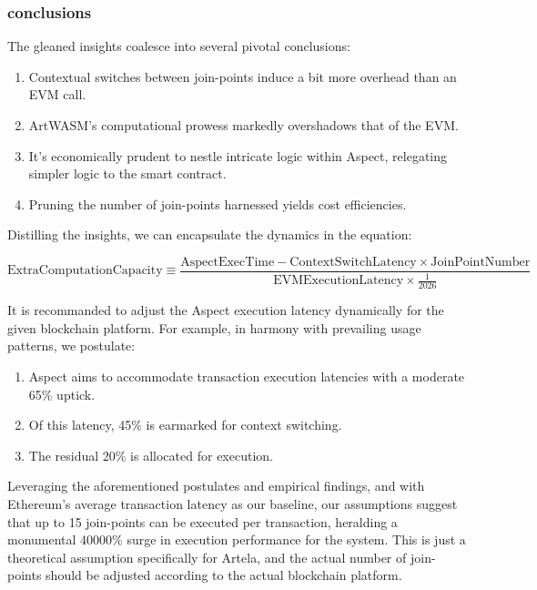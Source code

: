 \subsubsection{conclusions}
The gleaned insights coalesce into several pivotal conclusions:

\begin{enumerate}
  \item Contextual switches between join-points induce a bit more overhead than an EVM call.
  \item ArtWASM's computational prowess markedly overshadows that of the EVM.
  \item It's economically prudent to nestle intricate logic within Aspect, relegating simpler logic to the smart contract.
  \item Pruning the number of join-points harnessed yields cost efficiencies.
\end{enumerate}

Distilling the insights, we can encapsulate the dynamics in the equation:

\[
  \text{ExtraComputationCapacity} \equiv \frac{\text{AspectExecTime} - \text{ContextSwitchLatency} \times \text{JoinPointNumber}}{\text{EVMExecutionLatency} \times \frac{1}{2026}}
\]

It is recommanded to adjust the Aspect execution latency dynamically for the given blockchain platform. For example, in harmony with prevailing usage patterns, we postulate:

\begin{enumerate}
  \item Aspect aims to accommodate transaction execution latencies with a moderate 65\% uptick.
  \item Of this latency, 45\% is earmarked for context switching.
  \item The residual 20\% is allocated for execution.
\end{enumerate}

Leveraging the aforementioned postulates and empirical findings, and with Ethereum's average transaction latency as our baseline, our assumptions suggest that up to 15 join-points can be executed per transaction, heralding a monumental 40000\% surge in execution performance for the system. This is just a theoretical assumption specifically for Artela, and the actual number of join-points should be adjusted according to the actual blockchain platform.
